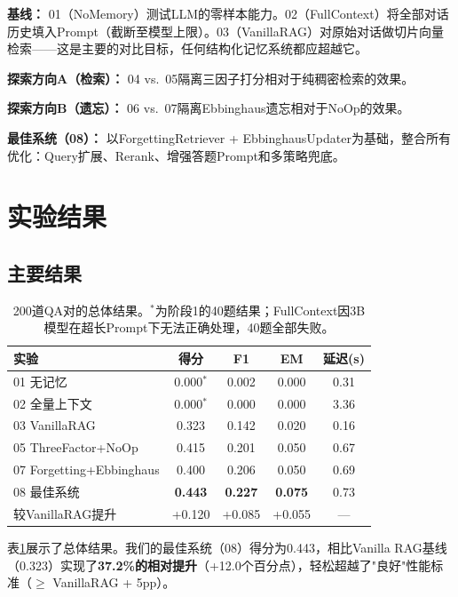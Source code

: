 \documentclass[11pt,a4paper]{ctexart}
\begin{document}
\textbf{基线：} 01（NoMemory）测试LLM的零样本能力。02（FullContext）将全部对话历史填入Prompt（截断至模型上限）。03（VanillaRAG）对原始对话做切片向量检索——这是主要的对比目标，任何结构化记忆系统都应超越它。

\textbf{探索方向A（检索）：} 04 vs.\ 05隔离三因子打分相对于纯稠密检索的效果。

\textbf{探索方向B（遗忘）：} 06 vs.\ 07隔离Ebbinghaus遗忘相对于NoOp的效果。

\textbf{最佳系统（08）：} 以ForgettingRetriever + EbbinghausUpdater为基础，整合所有优化：Query扩展、Rerank、增强答题Prompt和多策略兜底。

\section{实验结果}

\subsection{主要结果}

\begin{table}[H]
\centering
\begin{tabular}{@{}lcccc@{}}
\toprule
\textbf{实验} & \textbf{得分} & \textbf{F1} & \textbf{EM} & \textbf{延迟(s)} \\
\midrule
01 无记忆 & 0.000$^*$ & 0.002 & 0.000 & 0.31 \\
02 全量上下文 & 0.000$^*$ & 0.000 & 0.000 & 3.36 \\
03 VanillaRAG & 0.323 & 0.142 & 0.020 & 0.16 \\
05 ThreeFactor+NoOp & 0.415 & 0.201 & 0.050 & 0.67 \\
07 Forgetting+Ebbinghaus & 0.400 & 0.206 & 0.050 & 0.69 \\
08 最佳系统 & \textbf{0.443} & \textbf{0.227} & \textbf{0.075} & 0.73 \\
\midrule
较VanillaRAG提升 & +0.120 & +0.085 & +0.055 & --- \\
\bottomrule
\end{tabular}
\caption{200道QA对的总体结果。$^*$为阶段1的40题结果；FullContext因3B模型在超长Prompt下无法正确处理，40题全部失败。}
\label{tab:main}
\end{table}

表\ref{tab:main}展示了总体结果。我们的最佳系统（08）得分为0.443，相比Vanilla RAG基线（0.323）实现了\textbf{37.2\%的相对提升}（+12.0个百分点），轻松超越了"良好"性能标准（$\geq$ VanillaRAG + 5pp）。
\end{document}
